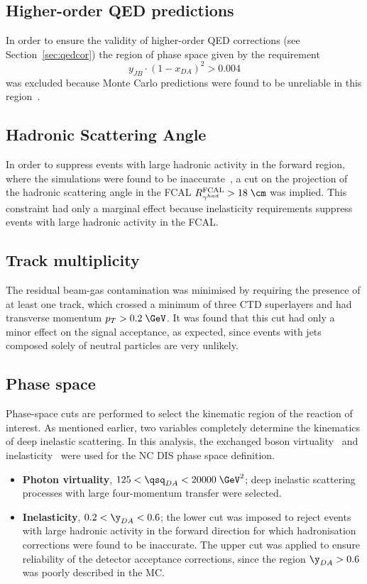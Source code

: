 \subsection{Higher-order QED predictions}
\label{subsec:qedcorcut}
In order to ensure the validity of higher-order QED corrections (see Section~\ref{sec:qedcor}) the region of phase space given by the requirement 
\begin{equation}
y_{JB}\cdot\left(1-x_{DA}\right)^2>0.004
\end{equation}
was excluded because Monte Carlo predictions were found to be unreliable in this region~\cite{cpc:81:381}.

\subsection{Hadronic Scattering Angle}
\label{subsec:gammahadcut}
In order to suppress events with large hadronic activity in the forward region, where the simulations were found to be inaccurate~\cite{thesis:jose:2003}, a cut on the projection of the hadronic scattering angle in the FCAL $R^\text{FCAL}_{\gamma^{had}} > 18\;\cm$ was implied. This constraint had only a marginal effect because inelasticity requirements suppress events with large hadronic activity in the FCAL.

\subsection{Track multiplicity}
\label{subsec:trackmultcut}
The residual beam-gas contamination was minimised by requiring the presence of at least one track, which crossed a minimum of three CTD superlayers and had transverse momentum $p_T>0.2\;\GeV$. It was found that this cut had only a minor effect on the signal acceptance, as expected, since events with jets composed solely of neutral particles are very unlikely.

\subsection{Phase space}
\label{subsec:phasespace}
Phase-space cuts are performed to select the kinematic region of the reaction of interest. As mentioned earlier, two variables completely determine the kinematics of deep inelastic scattering. In this analysis, the exchanged boson virtuality \qsq~and inelasticity \y~were used for the NC DIS phase space definition.
\begin{itemize}
	\item \textbf{Photon virtuality}, $125 < \qsq_{DA} < 20000\;\GeV^2$;  deep inelastic scattering processes with large four-momentum transfer were selected.
	\item \textbf{Inelasticity}, $0.2 < \y_{DA} < 0.6$; the lower cut was imposed to reject events with large hadronic activity in the forward direction for which hadronisation corrections were found to be inaccurate. The upper cut was applied to ensure reliability of the detector acceptance corrections, since the region $\y_{DA} > 0.6$ was poorly described in the MC.
\end{itemize}

